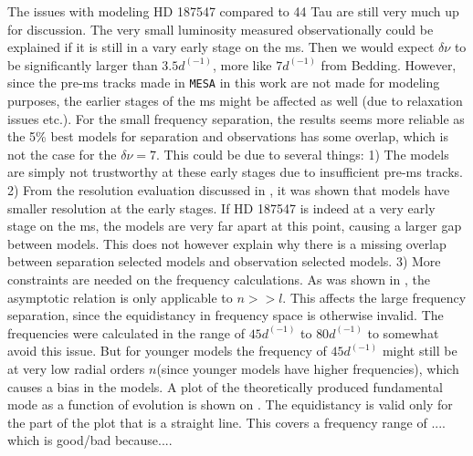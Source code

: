 The issues with modeling HD 187547 compared to 44 Tau are still very much up for discussion. The very small luminosity measured observationally could be explained if it is still in a vary early stage on the ms. Then we would expect $\delta \nu$ to be significantly larger than $3.5d^(-1)$, more like $7d^(-1)$ from Bedding. However, since the pre-ms tracks made in \texttt{MESA} in this work are not made for modeling purposes, the earlier stages of the ms might be affected as well (due to relaxation issues etc.). For the small frequency separation, the results seems more reliable as the 5\% best models for separation and observations has some overlap, which is not the case for the $\delta \nu = 7$. This could be due to several things: 1) The models are simply not trustworthy at these early stages due to insufficient pre-ms tracks. 2) From the resolution evaluation discussed in , it was shown that models have smaller resolution at the early stages. If HD 187547 is indeed at a very early stage on the ms, the models are very far apart at this point, causing a larger gap between models. This does not however explain why there is a missing overlap between separation selected models and observation selected models.
3) More constraints are needed on the frequency calculations. As was shown in , the asymptotic relation is only applicable to $n >> l$. This affects the large frequency separation, since the equidistancy in frequency space is otherwise invalid. The frequencies were calculated in the range of $45d^(-1)$ to $80d^(-1)$ to somewhat avoid this issue. But for younger models the frequency of $45d^(-1)$ might still be at very low radial orders $n$(since younger models have higher frequencies), which causes a bias in the models. A plot of the theoretically produced fundamental mode as a function of evolution is shown on .  The equidistancy is valid only for the part of the plot that is a straight line. This covers a frequency range of .... which is good/bad because....


